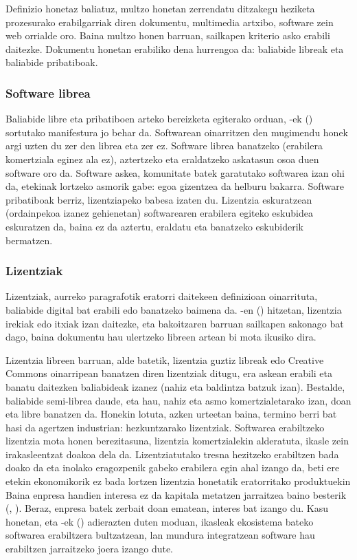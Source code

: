 Definizio honetaz baliatuz, multzo honetan zerrendatu ditzakegu heziketa prozesurako erabilgarriak diren dokumentu, multimedia artxibo, software zein web orrialde oro. Baina multzo honen barruan, sailkapen kriterio asko erabili daitezke. Dokumentu honetan erabiliko dena hurrengoa da: baliabide libreak eta baliabide pribatiboak.

\subsubsection{Software librea}\label{subsubsec:softwarelibre}

Baliabide libre eta pribatiboen arteko bereizketa egiterako orduan, \citeauthor{stallman2002}-ek (\citeyear{stallman2002}) sortutako manifestura jo behar da. Softwarean oinarritzen den mugimendu honek argi uzten du zer den librea eta zer ez. Software librea banatzeko (erabilera komertziala eginez ala ez), aztertzeko eta eraldatzeko askatasun osoa duen software oro da. Software askea, komunitate batek garatutako softwarea izan ohi da, etekinak lortzeko asmorik gabe: egoa gizentzea da helburu bakarra. Software pribatiboak berriz, lizentziapeko babesa izaten du. Lizentzia eskuratzean (ordainpekoa izanez gehienetan) softwarearen erabilera egiteko eskubidea eskuratzen da, baina ez da aztertu, eraldatu eta banatzeko eskubiderik bermatzen. 

\subsubsection{Lizentziak}\label{subsubsec:lizentzia}

Lizentziak, aurreko paragrafotik eratorri daitekeen definizioan oinarrituta, baliabide digital bat erabili edo banatzeko baimena da. \citeauthor{labrador2012}-en (\citeyear{labrador2012}) hitzetan, lizentzia irekiak edo itxiak izan daitezke, eta bakoitzaren barruan sailkapen sakonago bat dago, baina dokumentu hau ulertzeko libreen artean bi mota ikusiko dira.

Lizentzia libreen barruan, alde batetik, lizentzia guztiz libreak edo Creative Commons oinarripean banatzen diren lizentziak ditugu, era askean erabili eta banatu daitezken baliabideak izanez (nahiz eta baldintza batzuk izan). Bestalde, baliabide semi-librea daude, eta hau, nahiz eta asmo komertzialetarako izan, doan eta libre banatzen da. Honekin lotuta, azken urteetan baina, termino berri bat hasi da agertzen industrian: hezkuntzarako lizentziak. Softwarea erabiltzeko lizentzia mota honen berezitasuna, lizentzia komertzialekin alderatuta, ikasle zein irakasleentzat doakoa dela da. Lizentziatutako tresna hezitzeko erabiltzen bada doako da eta inolako eragozpenik gabeko erabilera egin ahal izango da, beti ere etekin ekonomikorik ez bada lortzen lizentzia honetatik eratorritako produktuekin Baina enpresa handien interesa ez da kapitala metatzen jarraitzea baino besterik (\citeauthor{marx1867}, \citeyear{marx1867}). Beraz, enpresa batek zerbait doan ematean, interes bat izango du. Kasu honetan, eta \citeauthor{brouilette2002}-ek (\citeyear{brouilette2002}) adierazten duten moduan, ikasleak ekosistema bateko softwarea erabiltzera bultzatzean, lan mundura integratzean software hau erabiltzen jarraitzeko joera izango dute. 



